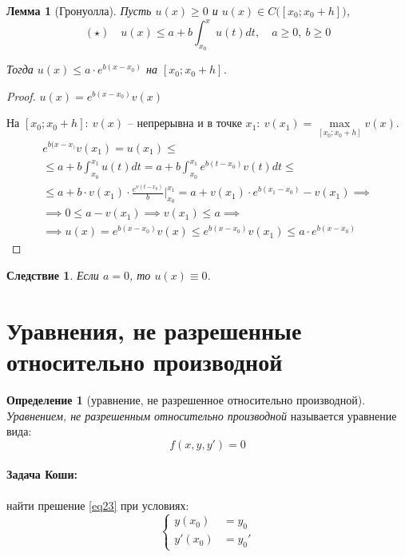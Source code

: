 \documentclass[11pt,a4paper,oneside]{report}
\theoremstyle{definition}
\newtheorem{definition}{Определение}[section]
\theoremstyle{plain}
\newtheorem{lemma}{Лемма}[section]
\newtheorem*{effect}{Следствие}
\theoremstyle{remark}
\begin{document}
\begin{lemma}[Гронуолла]
    Пусть $u(x) \geqslant 0$ и $u(x) \in C\big([x_0;x_0+h]\big)$,
    \begin{equation*}
        (\star) \quad u(x)\leqslant a + b\int_{x_0}^{x}u(t)dt, \quad a\geqslant 0, \ b\geqslant 0
    \end{equation*}

    Тогда $u(x)\leqslant a\cdot e^{b(x-x_0)}$ на $[x_0;x_0+h]$.
\end{lemma}

\begin{proof}
    $u(x) = e^{b(x-x_0)}v(x)$

    На $[x_0;x_0+h]: \ v(x)$ -- непрерывна и в точке $x_1: \ v(x_1) =\underset{[x_0;x_0+h]}{\max}v(x)$.
    \begin{multline*}
        e^{b(x-x_)}v(x_1) = u(x_1) \leqslant \\
        \leqslant a+b \int_{x_0}^{x_1}u(t)dt = a+b\int_{x_0}^{x_1}e^{b(t-x_0)}v(t)dt \leqslant \\
        \leqslant a+b \cdot v(x_1)\cdot \frac{e^{v(t-x_0)}}{b}\Big|_{x_0}^{x_1} = a+ v(x_1)\cdot e^{b(x_1-x_0)} - v(x_1) \implies \\
        \implies 0 \leqslant a-v(x_1) \implies v(x_1) \leqslant a \implies \\
        \implies u(x) = e^{b(x-x_0)}v(x) \leqslant e^{b(x-x_0)}v(x_1) \leqslant a\cdot e^{b(x-x_0)}
    \end{multline*}
\end{proof}

\begin{effect}
    Если $a=0$, то $u(x) \equiv 0$.
\end{effect}

\section{Уравнения, не разрешенные относительно производной}

\begin{definition}[уравнение, не разрешенное относительно производной]
    \emph{Уравнением, не разрешенным относительно производной} называется уравнение вида:
    \begin{equation}\label{eq23}
        f(x,y,y') = 0
    \end{equation}
\end{definition}

\paragraph*{Задача Коши:} найти прешение \ref{eq23} при условиях:
\begin{equation}\label{eq24}
    \left\{\begin{array}{rl}
        y(x_0)  & = y_0  \\
        y'(x_0) & = y_0'
    \end{array}\right.
\end{equation}
\end{document}
